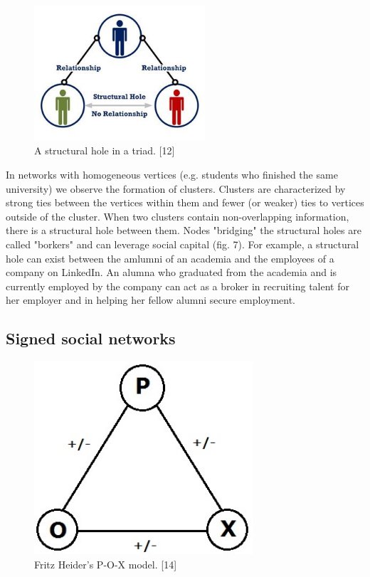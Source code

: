 \documentclass[conference,letterpaper]{IEEEtran}
\begin{document}
\begin{center}
\begin{figure}[hb]
\centering
\includegraphics[width=2.5in]{structural_hole}
\caption{
A structural hole in a triad. [12]
}
\label{fig_sim}
\end{figure}
\end{center}

In networks with homogeneous vertices (e.g. students who finished the same university) we observe the formation of clusters. Clusters are characterized by strong ties between the vertices within them and fewer (or weaker) ties to vertices outside of the cluster. When two clusters contain non-overlapping information, there is a structural hole between them. Nodes "bridging" the structural holes are called "borkers" and can leverage social capital (fig. 7). For example, a structural hole can exist between the amlumni of an academia and the employees of a company on LinkedIn. An alumna who graduated from the academia and is currently employed by the company can act as a broker in recruiting talent for her employer and in helping her fellow alumni secure employment.\\

\subsection{Signed social networks}

\begin{center}
\begin{figure}[hb]
\centering
\includegraphics[width=3.2in]{pox}
\caption{
Fritz Heider's P-O-X model. [14]
}
\label{fig_sim}
\end{figure}
\end{center}
\end{document}
